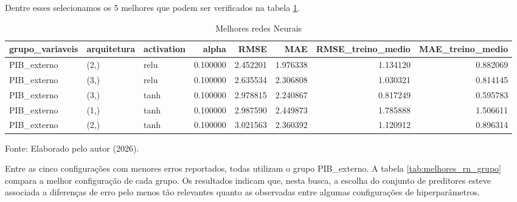 Dentre esses selecionamos os 5 melhores que podem ser verificados na tabela \ref{tab:melhores_rn}.

\begin{table}[htbp]
	\centering
	\captionsetup{justification=centering}
	\caption{Melhores redes Neurais}
	\label{tab:melhores_rn}
	
	\scriptsize
	\setlength{\tabcolsep}{2pt}
	\renewcommand{\arraystretch}{1.3}
	
	\begin{tabularx}{\textwidth}{>{\RaggedRight\arraybackslash}X>{\RaggedRight\arraybackslash}X>{\RaggedRight\arraybackslash}Xrrrrr}
		\toprule
		grupo\_variaveis & arquitetura & activation & alpha & RMSE & MAE & RMSE\_treino\_medio & MAE\_treino\_medio \\
		\midrule
		PIB\_externo & (2,) & relu & 0.100000 & 2.452201 & 1.976338 & 1.134120 & 0.882069 \\
		PIB\_externo & (3,) & relu & 0.100000 & 2.635534 & 2.306808 & 1.030321 & 0.814145 \\
		PIB\_externo & (3,) & tanh & 0.100000 & 2.978815 & 2.240867 & 0.817249 & 0.595783 \\
		PIB\_externo & (1,) & tanh & 0.100000 & 2.987590 & 2.449873 & 1.785888 & 1.506611 \\
		PIB\_externo & (2,) & tanh & 0.100000 & 3.021563 & 2.360392 & 1.120912 & 0.896314 \\
		\bottomrule
	\end{tabularx}
	
	
	\vspace{0.1cm}
	
	\small Fonte: Elaborado pelo autor (2026).
\end{table}





Entre as cinco configurações com menores erros reportados, todas utilizam o grupo PIB\_externo. A tabela \ref{tab:melhores_rn_grupo} compara a melhor configuração de cada grupo. Os resultados indicam que, nesta busca, a escolha do conjunto de preditores esteve associada a diferenças de erro pelo menos tão relevantes quanto as observadas entre algumas configurações de hiperparâmetros.



